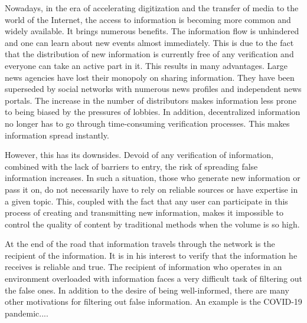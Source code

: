 Nowadays, in the era of accelerating digitization and the transfer of media to the world of the Internet, the access to information is becoming more common and widely available. It brings numerous benefits. The information flow is unhindered and one can learn about new events almost immediately. This is due to the fact that the distribution of new information is currently free of any verification and everyone can take an active part in it. This results in many advantages. Large news agencies have lost their monopoly on sharing information. They have been superseded by social networks with numerous news profiles and independent news portals. The increase in the number of distributors makes information less prone to being biased by the pressures of lobbies. In addition, decentralized information no longer has to go through time-consuming verification processes. This makes information spread instantly.

However, this has its downsides. Devoid of any verification of information, combined with the lack of barriers to entry, the risk of spreading false information increases. In such a situation, those who generate new information or pass it on, do not necessarily have to rely on reliable sources or have expertise in a given topic. This, coupled with the fact that any user can participate in this process of creating and transmitting new information, makes it impossible to control the quality of content by traditional methods when the volume is so high.

At the end of the road that information travels through the network is the recipient of the information. It is in his interest to verify that the information he receives is reliable and true. The recipient of information who operates in an environment overloaded with information faces a very difficult task of filtering out the false ones. In addition to the desire of being well-informed, there are many other motivations for filtering out false information. An example is the COVID-19 pandemic....

